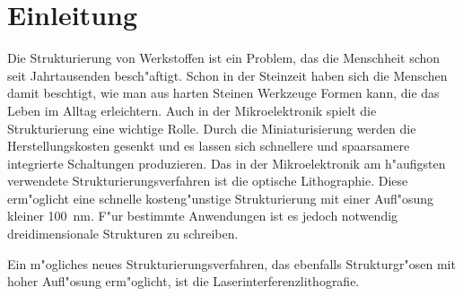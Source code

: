 
\chapter{Einleitung}
\label{ch:Introduction}
Die Strukturierung von Werkstoffen ist ein Problem, das die Menschheit schon seit Jahrtausenden besch"aftigt. Schon in der Steinzeit haben sich die Menschen damit beschtigt, wie man aus harten Steinen Werkzeuge Formen kann, die das Leben im Alltag erleichtern. Auch in der Mikroelektronik spielt die Strukturierung eine wichtige Rolle. Durch die Miniaturisierung werden die Herstellungskosten gesenkt und es lassen sich schnellere und spaarsamere integrierte Schaltungen produzieren. Das in der Mikroelektronik am h"aufigsten verwendete Strukturierungsverfahren ist die optische Lithographie. Diese erm"oglicht eine schnelle kosteng"unstige Strukturierung mit einer Aufl"osung kleiner 100~nm. F"ur bestimmte Anwendungen ist es jedoch notwendig dreidimensionale Strukturen zu schreiben.

Ein m"ogliches neues Strukturierungsverfahren, das ebenfalls Strukturgr"osen mit hoher Aufl"osung erm"oglicht, ist die Laserinterferenzlithografie. 



% 
